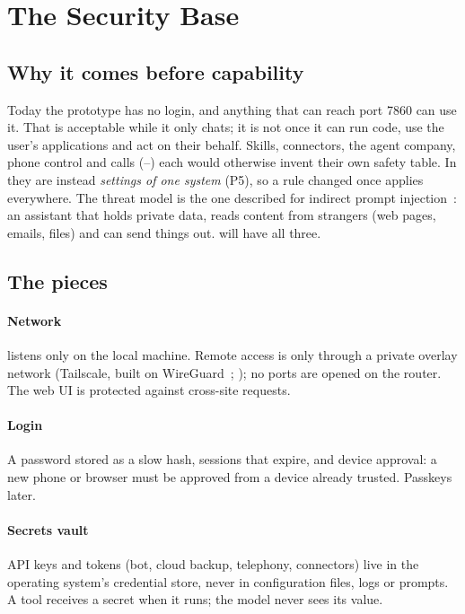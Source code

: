 \section{The Security Base}
\label{sec:security}

\subsection{Why it comes before capability}

Today the prototype has no login, and anything that can reach port 7860 can use it. That is acceptable while it only chats; it is not once it can run code, use the user's applications and act on their behalf. Skills, connectors, the agent company, phone control and calls (--) each would otherwise invent their own safety table. In \hivi{} they are instead \emph{settings of one system} (P5), so a rule changed once applies everywhere. The threat model is the one described for indirect prompt injection~\cite{greshake2023}: an assistant that holds private data, reads content from strangers (web pages, emails, files) and can send things out. \hivi{} will have all three.

\subsection{The pieces}

\paragraph{Network} \hivi{} listens only on the local machine. Remote access is only through a private overlay network (Tailscale, built on WireGuard~\cite{wireguard}; ); no ports are opened on the router. The web UI is protected against cross-site requests.

\paragraph{Login} A password stored as a slow hash, sessions that expire, and device approval: a new phone or browser must be approved from a device already trusted. Passkeys later.

\paragraph{Secrets vault} API keys and tokens (bot, cloud backup, telephony, connectors) live in the operating system's credential store, never in configuration files, logs or prompts. A tool receives a secret when it runs; the model never sees its value.

